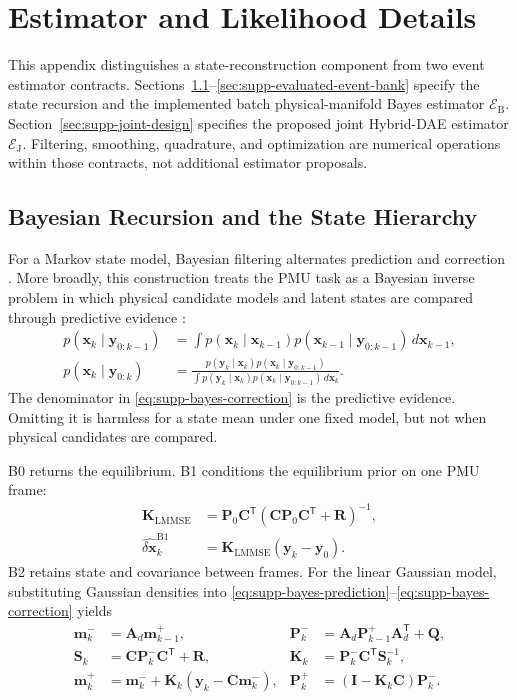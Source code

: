 \section{Estimator and Likelihood Details}
\label{app:estimator}

This appendix distinguishes a state-reconstruction component from two event
estimator contracts. Sections~\ref{sec:supp-state-recursion}--\ref{sec:supp-evaluated-event-bank}
specify the state recursion and the implemented batch physical-manifold Bayes
estimator $\mathcal E_{\mathrm B}$. Section~\ref{sec:supp-joint-design} specifies
the proposed joint Hybrid-DAE estimator $\mathcal E_{\mathrm J}$. Filtering,
smoothing, quadrature, and optimization are numerical operations within those
contracts, not additional estimator proposals.

\subsection{Bayesian Recursion and the State Hierarchy}
\label{sec:supp-state-recursion}

For a Markov state model, Bayesian filtering alternates prediction and correction \cite{sarkka2013bayesian}. More broadly, this construction treats the PMU task as a Bayesian inverse problem in which physical candidate models and latent states are compared through predictive evidence \cite{stuart2010inverse}:
\begin{align}
 p(\bm x_k\mid\bm y_{0:k-1})
 &=\int p(\bm x_k\mid\bm x_{k-1})
 p(\bm x_{k-1}\mid\bm y_{0:k-1})\,d\bm x_{k-1},
 \label{eq:supp-bayes-prediction}\\
 p(\bm x_k\mid\bm y_{0:k})
 &=\frac{p(\bm y_k\mid\bm x_k)
 p(\bm x_k\mid\bm y_{0:k-1})}
 {\int p(\bm y_k\mid\bm x_k)
 p(\bm x_k\mid\bm y_{0:k-1})\,d\bm x_k}.
 \label{eq:supp-bayes-correction}
\end{align}
The denominator in \eqref{eq:supp-bayes-correction} is the predictive evidence. Omitting it is harmless for a state mean under one fixed model, but not when physical candidates are compared.

B0 returns the equilibrium. B1 conditions the equilibrium prior on one PMU frame:
\begin{align}
 \bm K_{\mathrm{LMMSE}}
 &=\bm P_0\bm C^{\mathsf T}
 (\bm C\bm P_0\bm C^{\mathsf T}+\bm R)^{-1},\\
 \widehat{\delta\bm x}^{\mathrm{B1}}_k
 &=\bm K_{\mathrm{LMMSE}}(\bm y_k-\bm y_0).
 \label{eq:supp-b1-update}
\end{align}
B2 retains state and covariance between frames. For the linear Gaussian model, substituting Gaussian densities into \eqref{eq:supp-bayes-prediction}--\eqref{eq:supp-bayes-correction} yields
\begin{align}
 \bm m_k^-&=\bm A_d\bm m_{k-1}^+,
 &\bm P_k^-&=\bm A_d\bm P_{k-1}^+\bm A_d^{\mathsf T}+\bm Q,\label{eq:supp-kf-predict}\\
 \bm S_k&=\bm C\bm P_k^-\bm C^{\mathsf T}+\bm R,
 &\bm K_k&=\bm P_k^-\bm C^{\mathsf T}\bm S_k^{-1},\label{eq:supp-kf-gain}\\
 \bm m_k^+&=\bm m_k^-+\bm K_k(\bm y_k-\bm C\bm m_k^-),
 &\bm P_k^+&=(\bm I-\bm K_k\bm C)\bm P_k^-.
 \label{eq:supp-kf-correct}
\end{align}

